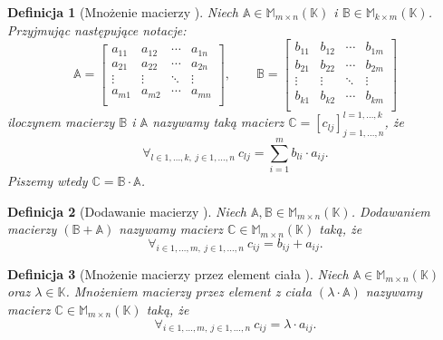 \documentclass[12pt,a4paper]{report}
\newtheorem{df}{Definicja}[chapter]
\newcommand{\setK}{\mathbb{K}}
\begin{document}
\begin{df}[Mnożenie macierzy {\citep[Sec 9.3 Def 9.13]{alzega}}]
Niech $\mathbb{A} \in \mathbb{M}_{m \times n} (\setK)$ i $\mathbb{B} \in \mathbb{M}_{k \times m} (\setK)$. Przyjmując następujące notacje:
$$
\mathbb{A} = \left[
        \begin{array}{cccc}
         a_{11} & a_{12} & \cdots & a_{1n} \\
         a_{21} & a_{22} & \cdots & a_{2n} \\
         \vdots & \vdots & \ddots & \vdots \\
         a_{m1} & a_{m2} & \cdots & a_{mn} \\
         \end{array}
      \right],
      \qquad
\mathbb{B} = \left[
        \begin{array}{cccc}
         b_{11} & b_{12} & \cdots & b_{1m} \\
         b_{21} & b_{22} & \cdots & b_{2m} \\
         \vdots & \vdots & \ddots & \vdots \\
         b_{k1} & b_{k2} & \cdots & b_{km} \\
         \end{array}
      \right]
$$
iloczynem macierzy $\mathbb{B}$ i $\mathbb{A}$ nazywamy taką macierz $\mathbb{C} = [c_{lj}]_{j = 1, \ldots, n}^{l = 1, \ldots , k}$, że
$$
\forall_{l \in 1, \ldots, k, \: j \in 1, \ldots, n} \:c_{lj} = \sum_{i=1}^m b_{li} \cdot a_{ij}.
$$
Piszemy wtedy $\mathbb{C} = \mathbb{B} \cdot \mathbb{A}$.
\end{df}

\begin{df}[Dodawanie macierzy {\citep[Sec 8.1]{alzega}}]
Niech $\mathbb{A}, \mathbb{B} \in \mathbb{M}_{m \times n} (\setK)$.
Dodawaniem macierzy $(\mathbb{B} + \mathbb{A})$ nazywamy macierz $\mathbb{C} \in \mathbb{M}_{m \times n} (\setK)$ taką, że
$$
\forall_{i \in 1, \ldots, m, \: j \in 1, \ldots, n} \: c_{ij} = b_{ij} + a_{ij}.
$$
\end{df}

\begin{df}[Mnożenie macierzy przez element ciała {\citep[Sec 8.1]{alzega}}]
Niech $\mathbb{A} \in \mathbb{M}_{m \times n} (\setK)$ oraz $\lambda \in \setK$.
Mnożeniem macierzy przez element z ciała $(\lambda \cdot \mathbb{A})$ nazywamy macierz $\mathbb{C} \in \mathbb{M}_{m \times n} (\setK)$ taką, że
$$
\forall_{i \in 1, \ldots, m, \: j \in 1, \ldots, n} \: c_{ij} = \lambda \cdot a_{ij}.
$$
\end{df}
\end{document}
